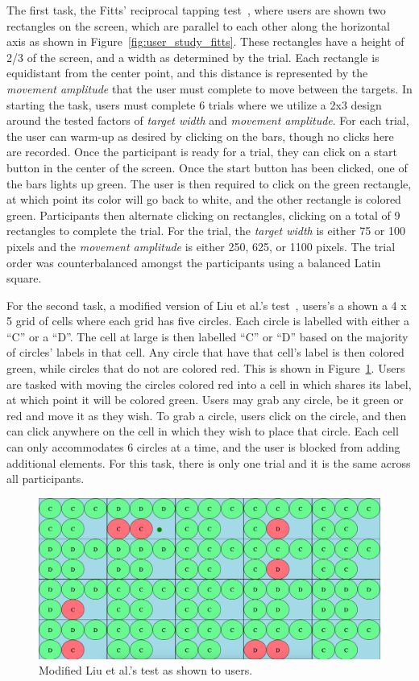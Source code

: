 The first task, the Fitts' reciprocal tapping
test~\cite{fitts_information_1954}, where users are shown two rectangles on the
screen, which are parallel to each other along the horizontal axis as shown
in Figure~\ref{fig:user_study_fitts}. These 
rectangles have a height of 2/3 of the screen, and a width as determined by the 
trial. Each rectangle is equidistant from the center point, and this distance
is represented by the \textit{movement amplitude} that the user must complete
to move between the targets. In starting the task, users must complete 6
trials where we utilize a 2x3 design around the tested factors of
\textit{target width} and \textit{movement amplitude}. For each trial, the user
can warm-up as desired by clicking on the bars, though no clicks here are
recorded. Once the participant is ready for a trial, they can click on a
start button in the center of the screen. Once the start button has been
clicked, one of the bars lights up green. The user is then required to click
on the green rectangle, at which point its color will go back to white, and
the other rectangle is colored green. Participants then alternate clicking on
rectangles, clicking on a total of 9 rectangles to complete the trial. For
the trial, the \textit{target width} is either 75 or 100 pixels and the
\textit{movement amplitude} is either 250, 625, or 1100 pixels. The trial order
was counterbalanced amongst the participants using a balanced Latin square.

For the second task, a modified version of Liu et al.'s 
test~\cite{liu_effects_2014}, users's a shown a 4 x 5 grid of cells where
each grid has five circles. Each circle is labelled with either a ``C'' or
a ``D''. The cell at large is then labelled ``C'' or ``D'' based on the majority
of circles' labels in that cell. Any circle that have that cell's label is
then colored green, while circles that do not are colored red. This is shown
in Figure~\ref{fig:user_study_lius}. Users are tasked with moving the circles
colored red into a cell in which shares its label, at which point it will
be colored green. Users may grab any circle, be it green or red and move it
as they wish. To grab a circle, users click on the circle, and then can click
anywhere on the cell in which they wish to place that circle. Each cell can
only accommodates 6 circles at a time, and the user is blocked from adding
additional elements. For this task, there is only one trial and it is the
same across all participants.

\begin{figure}
\centering
  \includegraphics[width=0.8\columnwidth]{chapters/04_muifold/figures/user_study_lius.png}
  \caption{Modified Liu et al.'s test as shown to users.}
  \label{fig:user_study_lius}
\end{figure}

